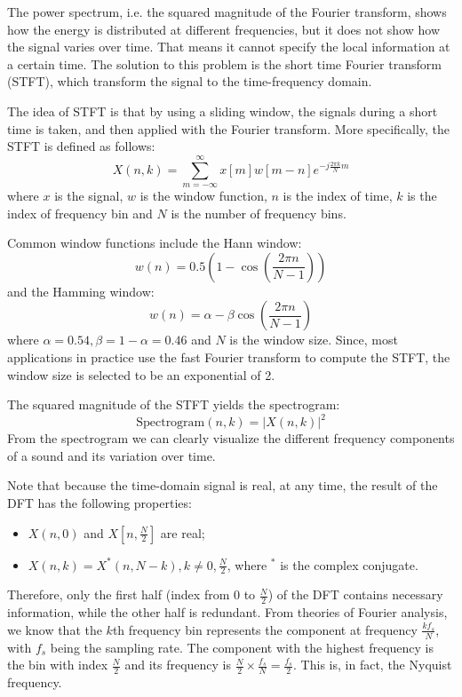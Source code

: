 \documentclass[12pt,final,twoside]{report}
\begin{document}
The power spectrum, i.e. the squared magnitude of the Fourier transform, shows how the energy is distributed at different frequencies, but it does not show how the signal varies over time. That means it cannot specify the local information at a certain time. The solution to this problem is the short time Fourier transform (STFT), which transform the signal to the time-frequency domain.

The idea of STFT is that by using a sliding window, the signals during a short time is taken, and then applied with the Fourier transform. More specifically, the STFT is defined as follows:
\begin{equation}
  X(n, k) = \sum_{m = -\infty}^{\infty} x[m]w[m-n]e^{-j \frac{2\pi k}{N} m}
\end{equation}
where $x$ is the signal, $w$ is the window function, $n$ is the index of time, $k$ is the index of frequency bin and $N$ is the number of frequency bins. 

Common window functions include the Hann window:
\begin{equation} w(n) = 0.5 (1 - \cos(\frac{2\pi n}{N-1})) \end{equation}
and the Hamming window:
\begin{equation} w(n) = \alpha - \beta \cos(\frac{2\pi n}{N-1}) \end{equation}
where $\alpha = 0.54, \beta = 1 - \alpha = 0.46$ and $N$ is the window size.
Since, most applications in practice use the fast Fourier transform to compute the STFT, the window size is selected to be an exponential of 2.

The squared magnitude of the STFT yields the spectrogram:
\[ \text{Spectrogram}(n, k) = \left|X(n,k)\right|^2 \]
From the spectrogram we can clearly visualize the different frequency components of a sound and its variation over time.

Note that because the time-domain signal is real, at any time, the result of the DFT has the following properties:
\begin{itemize}
  \item $X(n,0)$ and $X[n, \frac{N}{2}]$ are real;
  \item $X(n,k) = X^*(n,N-k), k \neq 0, \frac{N}{2}$, where $^*$ is the complex conjugate.
\end{itemize}

Therefore, only the first half (index from $0$ to $\frac{N}{2}$) of the DFT contains necessary information, while the other half is redundant. From theories of Fourier analysis, we know that the $k$th frequency bin represents the component at frequency $\frac{kf_s}{N}$, with $f_s$ being the sampling rate. The component with the highest frequency is the bin with index $\frac{N}{2}$ and its frequency is $\frac{N}{2} \times \frac{f_s}{N} = \frac{f_s}{2}$. This is, in fact, the Nyquist frequency.
\end{document}
